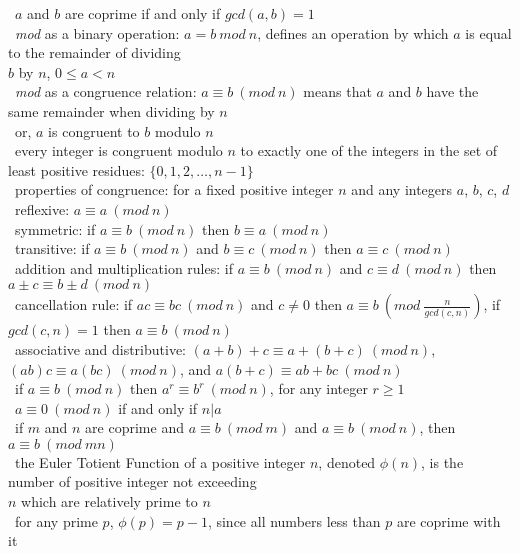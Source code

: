 \documentclass[10pt,letterpaper]{scrartcl}
\newcommand{\tbul}{\textbullet}
\newcommand{\tend}{\>\textendash}
\begin{document}
\begin{tabbing}
\begin{tabbing}
\tbul\ $a$ and $b$ are coprime if and only if $gcd(a,b)=1$\\
\tbul\ \textit{mod} as a binary operation: $a = b\ mod \ n $, defines an operation by which $a$ is equal to the remainder of dividing \\ $b$ by $n$, $0\leq a < n$ \\
\tbul\ \textit{mod} as a congruence relation: $a \equiv b\ (mod\ n)$ means that $a$ and $b$ have the same remainder when dividing by $n$ \\
    \tend\ or, $a$ is congruent to $b$ modulo $n$ \\
\tbul\ every integer is congruent modulo $n$ to exactly one of the integers in the set of least positive residues: $\{0,1,2,\ldots , n-1\}$ \\
\tbul\ properties of congruence: for a fixed positive integer $n$ and any integers $a$, $b$, $c$, $d$ \\
    \tend\ reflexive: $a\equiv a\ (mod\ n)$ \\
    \tend\ symmetric: if $a\equiv b\ (mod\ n)$ then $b\equiv a\ (mod\ n)$ \\
    \tend\ transitive: if $a\equiv b\ (mod\ n)$ and $b\equiv c\ (mod\ n)$ then $a\equiv c\ (mod\ n)$\\
    \tend\ addition and multiplication rules: if $a\equiv b\ (mod\ n)$ and $c\equiv d\ (mod\ n)$ then $a\pm c\equiv b\pm d\ (mod\ n)$ \\
    \tend\ cancellation rule: if $ac\equiv bc\ (mod\ n)$ and $c\neq 0$ then $a\equiv b\ (mod\ \frac{n}{gcd(c,n)})$, if $gcd(c,n)=1$ then $a\equiv b\ (mod\ n)$\\
    \tend\ associative and distributive: $(a+b)+c\equiv a+(b+c)\ (mod\ n)$, $(ab)c\equiv a(bc)\ (mod\ n)$, and $a(b+c)\equiv ab+bc\ (mod\ n)$\\
    \tend\ if $a\equiv b\ (mod\ n)$ then $a^r\equiv b^r\ (mod\ n)$, for any integer $r\geq 1$\\
    \tend\ $a\equiv 0\ (mod\ n)$ if and only if $n|a$\\
\tbul\ if $m$ and $n$ are coprime and $a\equiv b\ (mod\ m)$ and $a\equiv b\ (mod\ n)$, then $a\equiv b\ (mod\ mn)$ \\
\tbul\ the Euler Totient Function of a positive integer $n$, denoted $\phi (n)$, is the number of positive integer not exceeding \\ $n$ which are relatively prime to $n$ \\
\tbul\ for any prime $p$, $\phi (p)=p-1$, since all numbers less than $p$ are coprime with it \\

\end{tabbing}
\end{tabbing}
\end{document}
